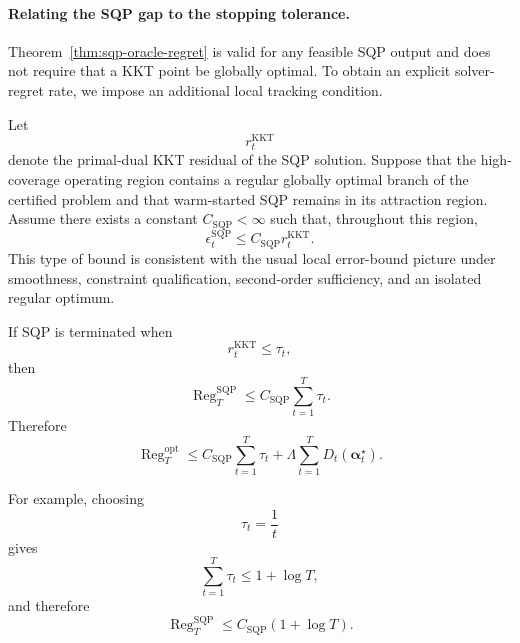 \documentclass[11pt]{article}
\newcommand{\Reg}{\operatorname{Reg}}
\begin{document}
\paragraph{Relating the SQP gap to the stopping tolerance.}
Theorem~\ref{thm:sqp-oracle-regret} is valid for any feasible SQP output and
does not require that a KKT point be globally optimal.  To obtain an explicit
solver-regret rate, we impose an additional local tracking condition.

Let
\[
    r_t^{\mathrm{KKT}}
\]
denote the primal-dual KKT residual of the SQP solution.  Suppose that the
high-coverage operating region contains a regular globally optimal branch of
the certified problem and that warm-started SQP remains in its attraction
region.  Assume there exists a constant $C_{\mathrm{SQP}}<\infty$ such that,
throughout this region,
\begin{equation}
\boxed{
    \epsilon_t^{\mathrm{SQP}}
    \le
    C_{\mathrm{SQP}}
    r_t^{\mathrm{KKT}}.
}
\label{eq:sqp-error-bound}
\end{equation}
This type of bound is consistent with the usual local error-bound picture
under smoothness, constraint qualification, second-order sufficiency, and an
isolated regular optimum.

If SQP is terminated when
\begin{equation}
    r_t^{\mathrm{KKT}}
    \le
    \tau_t,
    \label{eq:sqp-tolerance}
\end{equation}
then
\begin{equation}
\boxed{
    \Reg_T^{\mathrm{SQP}}
    \le
    C_{\mathrm{SQP}}
    \sum_{t=1}^{T}\tau_t.
}
\label{eq:sqp-tolerance-regret}
\end{equation}
Therefore
\begin{equation}
\boxed{
    \Reg_T^{\mathrm{opt}}
    \le
    C_{\mathrm{SQP}}
    \sum_{t=1}^{T}\tau_t
    +
    \Lambda
    \sum_{t=1}^{T}
    D_t(\bm\alpha_t^\star).
}
\label{eq:sqp-final-regret}
\end{equation}

For example, choosing
\[
    \tau_t=\frac1t
\]
gives
\begin{equation}
    \sum_{t=1}^{T}\tau_t
    \le
    1+\log T,
\end{equation}
and therefore
\begin{equation}
\boxed{
    \Reg_T^{\mathrm{SQP}}
    \le
    C_{\mathrm{SQP}}
    (1+\log T).
}
\label{eq:sqp-log-regret}
\end{equation}
\end{document}
